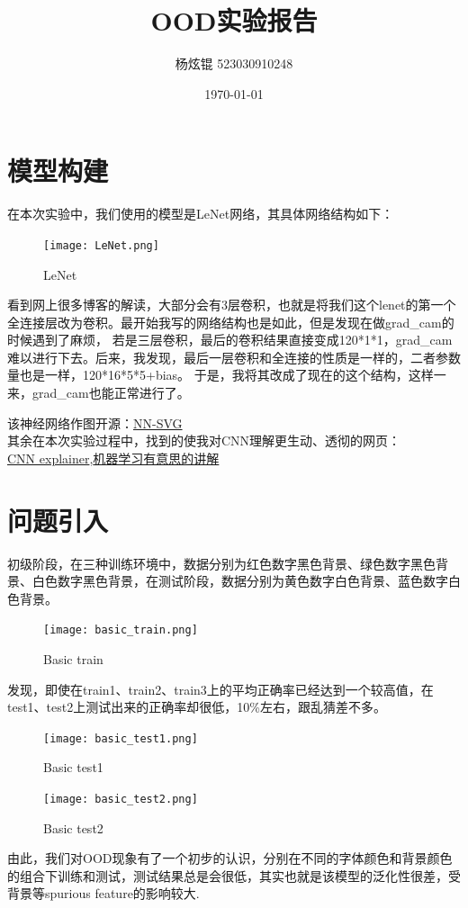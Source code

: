 \documentclass[12pt, a4paper, oneside]{ctexart}
\title{OOD实验报告}
\author{杨炫锟 523030910248}
\date{\today}
\begin{document}
\maketitle
\tableofcontents

\hypersetup{linkcolor=blue,urlcolor=blue,citecolor=blue}

\section{模型构建}

在本次实验中，我们使用的模型是LeNet网络，其具体网络结构如下：

\begin{figure}[H]
    \centering
    \texttt{[image: LeNet.png]}
    \caption{LeNet}
\end{figure}
看到网上很多博客的解读，大部分会有3层卷积，也就是将我们这个lenet的第一个全连接层改为卷积。最开始我写的网络结构也是如此，但是发现在做grad\_cam的时候遇到了麻烦，
若是三层卷积，最后的卷积结果直接变成120*1*1，grad\_cam难以进行下去。后来，我发现，最后一层卷积和全连接的性质是一样的，二者参数量也是一样，120*16*5*5+bias。
于是，我将其改成了现在的这个结构，这样一来，grad\_cam也能正常进行了。

该神经网络作图开源：\href{https://alexlenail.me/NN-SVG/LeNet.html}{NN-SVG}\\
其余在本次实验过程中，找到的使我对CNN理解更生动、透彻的网页：\\
\href{https://poloclub.github.io/cnn-explainer/}{CNN explainer},\href{https://www.ruder.io/}{机器学习有意思的讲解}

\section{问题引入}
初级阶段，在三种训练环境中，数据分别为红色数字黑色背景、绿色数字黑色背景、白色数字黑色背景，在测试阶段，数据分别为黄色数字白色背景、蓝色数字白色背景。
\begin{figure}[H]
    \centering
    \texttt{[image: basic\_train.png]}
    \caption{Basic train}
\end{figure}
发现，即使在train1、train2、train3上的平均正确率已经达到一个较高值，在test1、test2上测试出来的正确率却很低，10\%左右，跟乱猜差不多。
\begin{figure}[H]  
    \begin{minipage}[H]{0.5\linewidth} %
            \centering
            \texttt{[image: basic\_test1.png]}
            \caption{Basic test1}
     \end{minipage}
     \begin{minipage}[H]{0.5\linewidth} %
         \hspace{2mm}%
         \texttt{[image: basic\_test2.png]}
         \caption{Basic test2}
      \end{minipage}
\end{figure}
由此，我们对OOD现象有了一个初步的认识，分别在不同的字体颜色和背景颜色的组合下训练和测试，测试结果总是会很低，其实也就是该模型的泛化性很差，受背景等spurious feature的影响较大.
\end{document}
